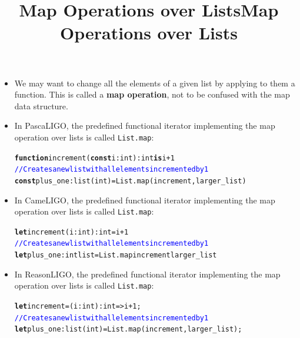 \documentclass[wide]{slides}
\newcommand{\Kconst}[0]{\textbf{const}\xspace}
\newcommand{\Kfunction}[0]{\textbf{function}\xspace}
\newcommand{\Kis}[0]{\textbf{is}\xspace}
\newcommand{\Klet}[0]{\textbf{let}\xspace}
\newcommand{\com}[1]{\textcolor{blue}{{#1}}}
\begin{document}
\begin{slide}
  \title{Map Operations over Lists}

  \begin{itemize}

    \item We may want to change all the elements of a given list by
      applying to them a function. This is called a \textbf{map
        operation}, not to be confused with the map data structure.

    \item In PascaLIGO, the predefined functional iterator
      implementing the map operation over lists is called
      \texttt{List.map}:
      \begin{alltt}
\Kfunction increment (\Kconst i : int): int \Kis i + 1
\com{// Creates a new list with all elements incremented by 1}
\Kconst plus_one : list (int) = List.map (increment, larger_list)
      \end{alltt}

    \item In CameLIGO, the predefined functional iterator implementing
      the map operation over lists is called \texttt{List.map}:
      \begin{alltt}
\Klet increment (i : int) : int = i + 1
\com{// Creates a new list with all elements incremented by 1}
\Klet plus_one : int list = List.map increment larger_list
      \end{alltt}

  \end{itemize}

\end{slide}

\begin{slide}
  \title{Map Operations over Lists}

  \begin{itemize}

    \item In ReasonLIGO, the predefined functional iterator
      implementing the map operation over lists is called
      \texttt{List.map}:
      \begin{alltt}
\Klet increment = (i : int) : int => i + 1;
\com{// Creates a new list with all elements incremented by 1}
\Klet plus_one : list (int) = List.map (increment, larger_list);
      \end{alltt}

  \end{itemize}

\end{slide}
\end{document}
